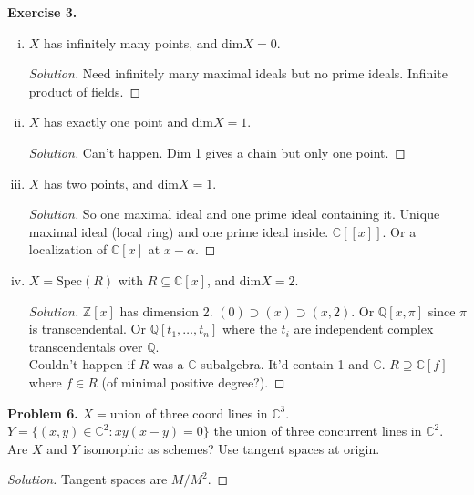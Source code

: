 \documentclass[11pt,letterpaper]{report}
\newcommand{\integers}{\mathbb{Z}}
\newcommand{\complex}{\mathbb{C}}
\newcommand{\rationals}{\mathbb{Q}}
\newcommand{\Spec}{\text{Spec}}
\newenvironment{solution}
{\begin{proof}[Solution]}
{\end{proof}}
\begin{document}
\noindent\textbf{Exercise 3. }
\begin{enumerate}[(i)]
	\item $X$ has infinitely many points, and dim$X = 0$.
	\begin{solution}
		Need infinitely many maximal ideals but no prime ideals. Infinite product of fields.
	\end{solution}

	\item $X$ has exactly one point and dim$X = 1$.
	\begin{solution}
		Can't happen. Dim 1 gives a chain but only one point.
	\end{solution}

	\item $X$ has two points, and dim$X=1$.
	\begin{solution}
		So one maximal ideal and one prime ideal containing it. Unique maximal ideal (local ring) and one prime ideal inside. $\complex[[x]]$. Or a localization of $\complex[x]$ at $x-\alpha$.
	\end{solution}

	\item $X = \Spec(R)$ with $R\subseteq \complex [x]$, and dim$X=2$.
	\begin{solution}
		$\integers[x]$ has dimension 2. $(0)\supset (x)\supset (x,2)$. Or $\rationals[x,\pi]$ since $\pi$ is transcendental. Or $\rationals[t_1, \ldots, t_n]$ where the $t_i$ are independent complex transcendentals over $\rationals$.\\
		\noindent Couldn't happen if $R$ was a $\complex$-subalgebra. It'd contain 1 and $\complex$. $R\supseteq \complex[f]$ where $f\in R$ (of minimal positive degree?). 
	\end{solution}
\end{enumerate}

\noindent\textbf{Problem 6. }$X = $union of three coord lines in $\complex^3$. $Y = \{(x,y)\in \complex^2: xy(x-y) = 0\}$ the union of three concurrent lines in $\complex^2$. Are $X$ and $Y$ isomorphic as schemes? Use tangent spaces at origin.
\begin{solution}
	Tangent spaces are $M/M^2$. 
\end{solution}
\end{document}

